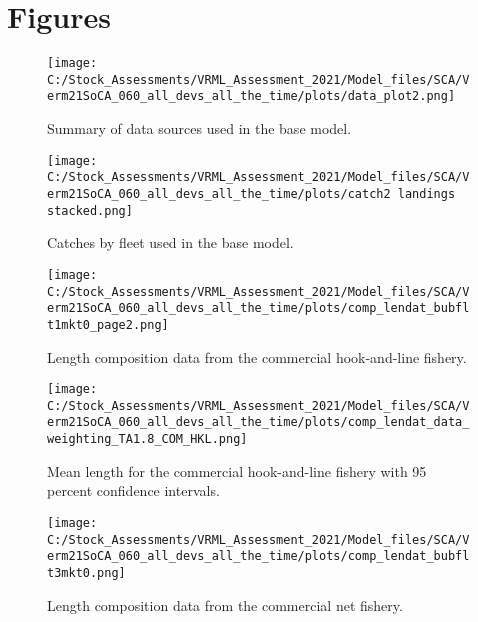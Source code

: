 \documentclass[11pt,
  english,
  a4paper,
]{article}
\begin{document}
\clearpage


\hypertarget{figures}{%
\section{Figures}\label{figures}}

\leavevmode\tagmcend\tagstructend

\begin{figure}
\centering
\texttt{[image: C:/Stock\_Assessments/VRML\_Assessment\_2021/Model\_files/SCA/Verm21SoCA\_060\_all\_devs\_all\_the\_time/plots/data\_plot2.png]}
\caption{Summary of data sources used in the base model.\label{fig:data-plot}}
\end{figure}

\begin{figure}
\centering
\texttt{[image: C:/Stock\_Assessments/VRML\_Assessment\_2021/Model\_files/SCA/Verm21SoCA\_060\_all\_devs\_all\_the\_time/plots/catch2 landings stacked.png]}
\caption{Catches by fleet used in the base model.\label{fig:catch}}
\end{figure}

\begin{figure}
\centering
\texttt{[image: C:/Stock\_Assessments/VRML\_Assessment\_2021/Model\_files/SCA/Verm21SoCA\_060\_all\_devs\_all\_the\_time/plots/comp\_lendat\_bubflt1mkt0\_page2.png]}
\caption{Length composition data from the commercial hook-and-line fishery.\label{fig:len-data-COM-HKL}}
\end{figure}

\begin{figure}
\centering
\texttt{[image: C:/Stock\_Assessments/VRML\_Assessment\_2021/Model\_files/SCA/Verm21SoCA\_060\_all\_devs\_all\_the\_time/plots/comp\_lendat\_data\_weighting\_TA1.8\_COM\_HKL.png]}
\caption{Mean length for the commercial hook-and-line fishery with 95 percent confidence intervals.\label{fig:mean-com-len-data-COM-HKL}}
\end{figure}

\begin{figure}
\centering
\texttt{[image: C:/Stock\_Assessments/VRML\_Assessment\_2021/Model\_files/SCA/Verm21SoCA\_060\_all\_devs\_all\_the\_time/plots/comp\_lendat\_bubflt3mkt0.png]}
\caption{Length composition data from the commercial net fishery.\label{fig:len-data-COM-NET}}
\end{figure}
\end{document}
